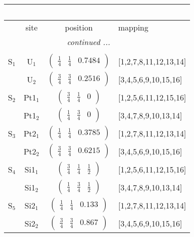 \documentclass[fleqn,10pt,landscape]{article}
\begin{document}
\begin{itemize}
\begin{center}
\begin{longtable}{cc|c|l}
\multicolumn{3}{l}{\tablename\ \thetable{}} \\
 \hline \hline
 & site & position & mapping \\ \hline \endhead

 \hline \hline
\multicolumn{3}{r}{\footnotesize\it continued ...} \\ \endfoot

 \hline \hline
\multicolumn{3}{r}{} \\ \endlastfoot

S$_{1}$ & U$_1$ & $\begin{pmatrix} \frac{1}{4} & \frac{1}{4} & 0.7484 \end{pmatrix}$ & [1,2,7,8,11,12,13,14] \\
& U$_2$ & $\begin{pmatrix} \frac{3}{4} & \frac{3}{4} & 0.2516 \end{pmatrix}$ & [3,4,5,6,9,10,15,16] \\ \hline
S$_{2}$ & Pt1$_1$ & $\begin{pmatrix} \frac{3}{4} & \frac{1}{4} & 0 \end{pmatrix}$ & [1,2,5,6,11,12,15,16] \\
& Pt1$_2$ & $\begin{pmatrix} \frac{1}{4} & \frac{3}{4} & 0 \end{pmatrix}$ & [3,4,7,8,9,10,13,14] \\ \hline
S$_{3}$ & Pt2$_1$ & $\begin{pmatrix} \frac{1}{4} & \frac{1}{4} & 0.3785 \end{pmatrix}$ & [1,2,7,8,11,12,13,14] \\
& Pt2$_2$ & $\begin{pmatrix} \frac{3}{4} & \frac{3}{4} & 0.6215 \end{pmatrix}$ & [3,4,5,6,9,10,15,16] \\ \hline
S$_{4}$ & Si1$_1$ & $\begin{pmatrix} \frac{3}{4} & \frac{1}{4} & \frac{1}{2} \end{pmatrix}$ & [1,2,5,6,11,12,15,16] \\
& Si1$_2$ & $\begin{pmatrix} \frac{1}{4} & \frac{3}{4} & \frac{1}{2} \end{pmatrix}$ & [3,4,7,8,9,10,13,14] \\ \hline
S$_{5}$ & Si2$_1$ & $\begin{pmatrix} \frac{1}{4} & \frac{1}{4} & 0.133 \end{pmatrix}$ & [1,2,7,8,11,12,13,14] \\
& Si2$_2$ & $\begin{pmatrix} \frac{3}{4} & \frac{3}{4} & 0.867 \end{pmatrix}$ & [3,4,5,6,9,10,15,16] \\
\end{longtable}
\end{center}


\end{itemize}
\end{document}
